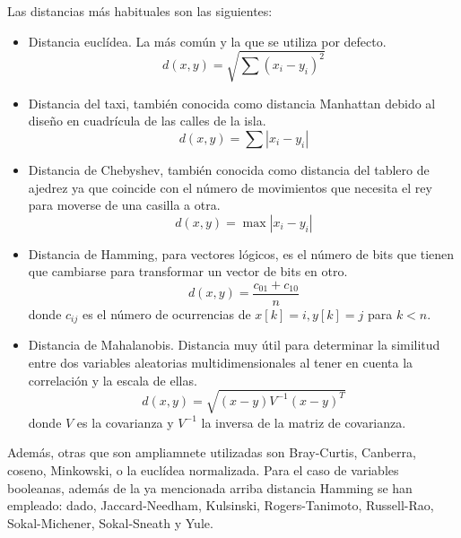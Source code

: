Las distancias más habituales son las siguientes:
\begin{itemize}
\item Distancia euclídea. La más común y la que se utiliza por defecto.
    \begin{equation}
    d(x,y) = \sqrt{\sum(x_i-y_i)^2} \nonumber
    \end{equation}
\item Distancia del taxi, también conocida como distancia Manhattan debido al dise\~no en cuadrícula de las calles de la isla.
    \begin{equation}
    d(x,y) = \sum |x_i - y_i| \nonumber
    \end{equation}
\item Distancia de Chebyshev, también conocida como distancia del tablero de ajedrez ya que coincide con el número de movimientos que necesita el rey para moverse de una casilla a otra.
    \begin{equation}
    d(x,y) = \max{|x_i - y_i|} \nonumber
    \end{equation}
\item Distancia de Hamming, para vectores lógicos, es el número de bits que tienen que cambiarse para transformar un vector de bits en otro.
    \begin{equation}
    d(x,y) = \frac{\displaystyle c_{01} + c_{10}}{\displaystyle n} \nonumber
    \end{equation}
donde $c_{ij}$ es el número de ocurrencias de $x[k] = i, y[k] = j$ para $k < n$. 
\item Distancia de Mahalanobis. Distancia muy útil para determinar la similitud entre dos variables aleatorias multidimensionales al tener en cuenta la correlación y la escala de ellas.
    \begin{equation}
    d(x,y) = \sqrt{(x-y)V^{-1}(x-y)^T} \nonumber
    \end{equation}
donde $V$ es la covarianza y $V^{-1}$ la inversa de la matriz de covarianza.
\end{itemize}

Además, otras que son ampliamnete utilizadas son Bray-Curtis, Canberra, coseno, Minkowski, o la euclídea normalizada. Para el caso de variables booleanas, además de la ya mencionada arriba distancia Hamming se han empleado: dado, Jaccard-Needham, Kulsinski, Rogers-Tanimoto, Russell-Rao, Sokal-Michener, Sokal-Sneath y Yule. \\

